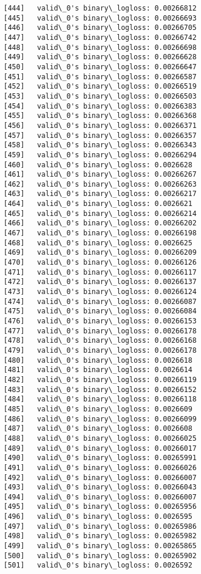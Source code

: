 \documentclass[11pt]{article}
\begin{document}
\begin{Verbatim}[commandchars=\\\{\}]
[444]	valid\_0's binary\_logloss: 0.00266812
[445]	valid\_0's binary\_logloss: 0.00266693
[446]	valid\_0's binary\_logloss: 0.00266705
[447]	valid\_0's binary\_logloss: 0.00266742
[448]	valid\_0's binary\_logloss: 0.00266698
[449]	valid\_0's binary\_logloss: 0.00266628
[450]	valid\_0's binary\_logloss: 0.00266647
[451]	valid\_0's binary\_logloss: 0.00266587
[452]	valid\_0's binary\_logloss: 0.00266519
[453]	valid\_0's binary\_logloss: 0.00266503
[454]	valid\_0's binary\_logloss: 0.00266383
[455]	valid\_0's binary\_logloss: 0.00266368
[456]	valid\_0's binary\_logloss: 0.00266371
[457]	valid\_0's binary\_logloss: 0.00266357
[458]	valid\_0's binary\_logloss: 0.00266343
[459]	valid\_0's binary\_logloss: 0.00266294
[460]	valid\_0's binary\_logloss: 0.0026628
[461]	valid\_0's binary\_logloss: 0.00266267
[462]	valid\_0's binary\_logloss: 0.00266263
[463]	valid\_0's binary\_logloss: 0.00266217
[464]	valid\_0's binary\_logloss: 0.0026621
[465]	valid\_0's binary\_logloss: 0.00266214
[466]	valid\_0's binary\_logloss: 0.00266202
[467]	valid\_0's binary\_logloss: 0.00266198
[468]	valid\_0's binary\_logloss: 0.0026625
[469]	valid\_0's binary\_logloss: 0.00266209
[470]	valid\_0's binary\_logloss: 0.00266126
[471]	valid\_0's binary\_logloss: 0.00266117
[472]	valid\_0's binary\_logloss: 0.00266137
[473]	valid\_0's binary\_logloss: 0.00266124
[474]	valid\_0's binary\_logloss: 0.00266087
[475]	valid\_0's binary\_logloss: 0.00266084
[476]	valid\_0's binary\_logloss: 0.00266153
[477]	valid\_0's binary\_logloss: 0.00266178
[478]	valid\_0's binary\_logloss: 0.00266168
[479]	valid\_0's binary\_logloss: 0.00266178
[480]	valid\_0's binary\_logloss: 0.0026618
[481]	valid\_0's binary\_logloss: 0.0026614
[482]	valid\_0's binary\_logloss: 0.00266119
[483]	valid\_0's binary\_logloss: 0.00266152
[484]	valid\_0's binary\_logloss: 0.00266118
[485]	valid\_0's binary\_logloss: 0.0026609
[486]	valid\_0's binary\_logloss: 0.00266099
[487]	valid\_0's binary\_logloss: 0.0026608
[488]	valid\_0's binary\_logloss: 0.00266025
[489]	valid\_0's binary\_logloss: 0.00266017
[490]	valid\_0's binary\_logloss: 0.00265991
[491]	valid\_0's binary\_logloss: 0.00266026
[492]	valid\_0's binary\_logloss: 0.00266007
[493]	valid\_0's binary\_logloss: 0.00266043
[494]	valid\_0's binary\_logloss: 0.00266007
[495]	valid\_0's binary\_logloss: 0.00265956
[496]	valid\_0's binary\_logloss: 0.0026595
[497]	valid\_0's binary\_logloss: 0.00265986
[498]	valid\_0's binary\_logloss: 0.00265982
[499]	valid\_0's binary\_logloss: 0.00265865
[500]	valid\_0's binary\_logloss: 0.00265902
[501]	valid\_0's binary\_logloss: 0.0026592

\end{Verbatim}
\end{document}

